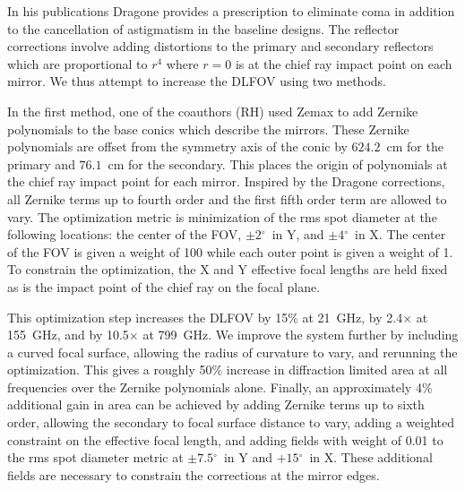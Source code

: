 \documentclass[]{spie}  %
\newcommand{\comr}[1]{\textcolor{red}{#1}}
\newcommand{\comb}[1]{\textcolor{blue}{#1}}
\newcommand{\como}[1]{\textcolor{orange}{#1}}
\newcommand{\dgr}{$^\circ$}
\begin{document}
In his publications Dragone provides a prescription to eliminate coma
in addition to the cancellation of astigmatism in the baseline designs.\cite{dragone_coma} The reflector corrections 
involve adding distortions to the primary and secondary reflectors 
which are proportional to $r^4$ where $r=0$ is at the chief ray impact point on each mirror. 
We thus attempt to increase the DLFOV using two methods. 

In the first method, one of the coauthors (RH) used Zemax to add Zernike 
polynomials to the base conics which describe the mirrors. These Zernike polynomials are offset from the symmetry axis of the conic 
by $624.2$~cm for the primary and $76.1$~cm for the secondary.  
This places the origin of polynomials at the chief ray impact point for each mirror. 
Inspired by the Dragone corrections, all Zernike terms up to fourth order and the first fifth order term are allowed to vary. 
The optimization metric is minimization of the rms spot diameter at 
the following locations: the center of the FOV, $\pm2$\dgr\ in Y, and $\pm4$\dgr\ in X. The center of the FOV is given a weight of 100
while each outer point is given a weight of 1. To constrain the optimization, the X and Y 
effective focal lengths are held fixed as is the impact point of the chief ray on the focal plane. 

This optimization step increases the DLFOV
by 15\% at 21~GHz, by 2.4$\times$ at 155~GHz, and by 
10.5$\times$ at 799~GHz. 
We improve the system further by including a curved focal surface, allowing the radius of 
curvature to vary, and rerunning the optimization.  
This gives a roughly 50\% increase in diffraction limited area at all frequencies over the Zernike polynomials alone.  
Finally, an approximately 4\% additional gain in area can be achieved by adding Zernike terms 
up to sixth order, allowing the secondary to focal surface distance to vary, adding a weighted constraint on the effective focal length, 
and adding fields with weight of 0.01 to the rms spot diameter metric at $\pm7.5$\dgr\ in Y and $+15$\dgr\ in X. 
These additional fields are necessary to constrain the corrections at the mirror edges.

\end{document}
